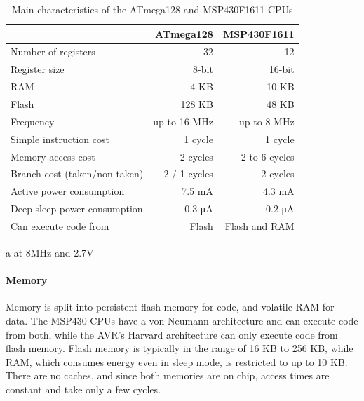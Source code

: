 \begin{table}
\caption{Main characteristics of the ATmega128 and MSP430F1611 CPUs}
\label{tbl-ATmega128-msp430f1611}
    \begin{threeparttable}
    \begin{tabular}{lrr}
    \toprule
                                           & ATmega128 \cite{Atmel:ATmega128Datasheet, Atmel:AVRInstructionSetManual}   & MSP430F1611 \cite{TexasInstrumentsIncorporated:MSP430F1611Datasheet, TexasInstrumentsIncorporated:MSP430x1xxUsersGuide} \\
    \midrule
    \midrule
    Number of registers                    & 32           & 12            \\
    Register size                          & 8-bit        & 16-bit        \\
    RAM                                    & 4 KB         & 10 KB         \\
    Flash                                  & 128 KB       & 48 KB         \\
    Frequency                              & up to 16 MHz & up to 8 MHz   \\
    Simple instruction cost                & 1 cycle      & 1 cycle       \\
    Memory access cost                     & 2 cycles     & 2 to 6 cycles \\
    Branch cost (taken/non-taken)          & 2 / 1 cycles & 2 cycles      \\
    Active power consumption\tnote{a}      & 7.5 mA       & 4.3 mA        \\ %
    Deep sleep power consumption           & 0.3 μA       & 0.2 μA        \\
    Can execute code from                  & Flash        & Flash and RAM \\
    \bottomrule
    \end{tabular}
    \begin{tablenotes}
        \item[a] at 8MHz and 2.7V
    \end{tablenotes}
    \end{threeparttable}
\end{table}

\paragraph{Memory}
Memory is split into persistent flash memory for code, and volatile RAM for data. The MSP430 CPUs have a von Neumann architecture and can execute code from both, while the AVR's Harvard architecture can only execute code from flash memory. Flash memory is typically in the range of 16 KB to 256 KB, while RAM, which consumes energy even in sleep mode, is restricted to up to 10 KB. There are no caches, and since both memories are on chip, access times are constant and take only a few cycles.

